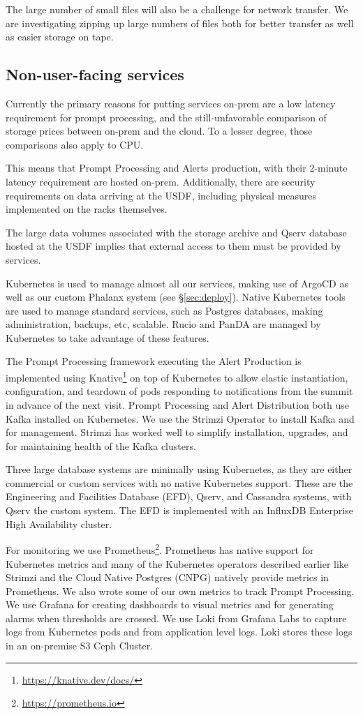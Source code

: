 The large number of small files will also be a challenge for network
transfer. We are investigating zipping up large numbers of files both
for better transfer as well as easier storage on tape.

\subsection{Non-user-facing services}

Currently the primary reasons for putting services on-prem are a low
latency requirement for prompt processing, and the still-unfavorable
comparison of storage prices between on-prem and the cloud. To a lesser
degree, those comparisons also apply to CPU.

This means that Prompt Processing and Alerts production, with their
2-minute latency requirement are hosted on-prem. Additionally, there
are security requirements on data arriving at the USDF, including
physical measures implemented on the racks themselves.\cite{DMTN-199}

The large data volumes associated with the storage archive and Qserv
database hosted at the USDF implies that external access to them must be
provided by services.

Kubernetes is used to manage almost all our services, making use of
ArgoCD as well as our custom Phalanx system (see \S \ref{sec:deploy}).
Native Kubernetes tools
are used to manage standard services, such as Postgres databases,
making administration, backups, etc, scalable. Rucio and PanDA are
managed by Kubernetes to take advantage of these features.

The Prompt Processing framework executing the Alert Production is implemented
using Knative\footnote{\url{https://knative.dev/docs/}} on top of
Kubernetes to allow elastic instantiation, configuration, and teardown of
pods responding to notifications from the summit in advance of the
next visit.
Prompt Processing and Alert Distribution both use Kafka installed on Kubernetes.
We use the Strimzi Operator to install Kafka and for management.  Strimzi
has worked well to simplify installation, upgrades, and for maintaining
health of the Kafka clusters.

Three large database systems are minimally using Kubernetes, as they
are either commercial or custom services with no native Kubernetes
support. These are the Engineering and Facilities Database (EFD),\cite{2024SPIE13101.59Ftmp}
Qserv, and Cassandra systems, with Qserv the custom system.
The EFD is implemented with an InfluxDB Enterprise High Availability cluster.

For monitoring we use Prometheus\footnote{\url{https://prometheus.io}}.  Prometheus has native support for
Kubernetes metrics and many of the Kubernetes operators described earlier
like Strimzi and the Cloud Native Postgres (CNPG) natively provide metrics in Prometheus. We also
wrote some of our own metrics to track Prompt Processing.
We use Grafana for creating dashboards to visual metrics and for generating alarms when thresholds are crossed.
We use Loki from Grafana Labs to capture logs from Kubernetes pods
and from application level logs. Loki stores these logs in an on-premise S3 Ceph Cluster.
